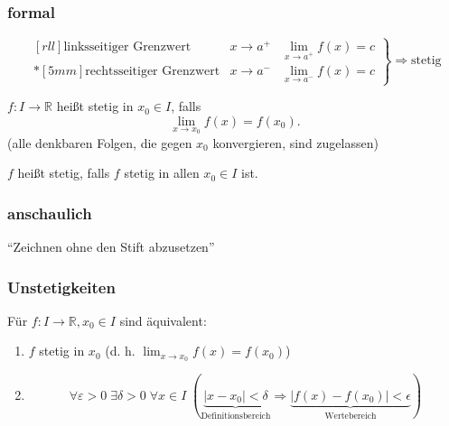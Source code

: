 \subsubsection*{formal}
\begin{equation*}
  \left.
  \begin{matrix}[rll]
    \text{linksseitiger Grenzwert} & x \longrightarrow a^+ & \displaystyle\lim_{x \rightarrow a^+} f(x) = c \\*[5mm]
    \text{rechtsseitiger Grenzwert} & x \longrightarrow a^- & \displaystyle\lim_{x \rightarrow a^-} f(x) = c
  \end{matrix}
  \right\}\Rightarrow \text{stetig}
\end{equation*}

\begin{definition}[Stetigkeit]
  $f: I \to \mathbb{R}$ heißt stetig in $x_0 \in I$, falls \begin{equation*} \lim_{x\rightarrow x_0} f(x) = f(x_0). \end{equation*} (alle denkbaren Folgen, die gegen $x_0$ konvergieren, sind zugelassen)

  $f$ heißt stetig, falls $f$ stetig in allen $x_0 \in I$ ist.
\end{definition}

\subsubsection*{anschaulich}
"`Zeichnen ohne den Stift abzusetzen"'


\subsubsection*{Unstetigkeiten}


\begin{theorem}
  Für $f: I \to \mathbb{R}, x_0 \in I$ sind äquivalent:
  \begin{enumerate}
    \item $f$ stetig in $x_0$ (d. h. $\displaystyle\lim_{x\rightarrow x_0} f(x) = f(x_0)$)
    \item
      \begin{equation*}
        \forall \varepsilon > 0\; \exists \delta > 0\; \forall x \in I\; \left(
          \underbrace{\left| x-x_0\right| < \delta}_{\text{Definitionsbereich}} \Rightarrow
          \underbrace{\left| f(x)-f(x_0)\right| < \epsilon}_{\text{Wertebereich}}
        \right)
      \end{equation*}
  \end{enumerate}
\end{theorem}

